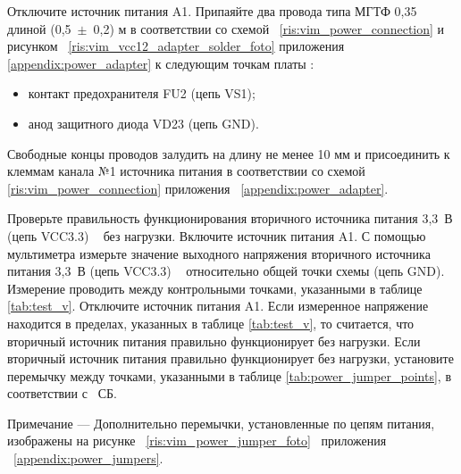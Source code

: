   \subpoint Отключите источник питания A1.
  \subpoint Припаяйте два провода типа МГТФ 0,35 длиной (0,5~$\pm$~0,2) м 
  в соответствии со схемой~ \ref{ris:vim_power_connection} и рисунком~ \ref{ris:vim_vcc12_adapter_solder_foto} приложения~ \ref{appendix:power_adapter} 
  к следующим точкам платы \DocProductShortTitle:
  \begin{itemize}
   \item контакт предохранителя FU2 (цепь VS1);
   \item анод защитного диода VD23 (цепь GND).
  \end{itemize}
  \subpoint Свободные концы проводов залудить на длину не менее 10 мм и присоединить к клеммам канала №1 источника питания
  в соответствии со схемой~ \ref{ris:vim_power_connection} приложения~ \ref{appendix:power_adapter}.
  
  
  \subpoint Проверьте правильность функционирования вторичного источника питания 3,3~В (цепь VCC3.3) \DocProductShortTitle~ без нагрузки.
  \label {test_vcc33} %
    \subsubpoint Включите источник питания A1.    
    \subsubpoint С помощью мультиметра измерьте значение выходного напряжения вторичного источника питания 3,3~В (цепь VCC3.3) \DocProductShortTitle~
		  относительно общей точки схемы (цепь GND). 
		  Измерение проводить между контрольными точками, указанными в таблице \ref{tab:test_v}.    
    \subsubpoint Отключите источник питания A1.    
    \subsubpoint Если измеренное напряжение находится в пределах, указанных в таблице \ref{tab:test_v}, то считается, что вторичный источник питания правильно функционирует без нагрузки.    
    \subsubpoint Если вторичный источник питания правильно функционирует без нагрузки, установите перемычку между точками, 
    указанными в таблице \ref{tab:power_jumper_points}, в соответствии с \DocProductSignature~СБ.
    
    \begin{footnotesize}    
      Примечание --- Дополнительно перемычки, установленные по цепям питания, изображены на рисунке ~\ref{ris:vim_power_jumper_foto}~ приложения ~\ref{appendix:power_jumpers}.
    \end{footnotesize}  
        
